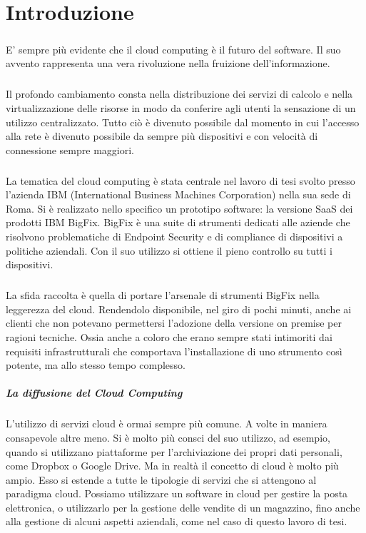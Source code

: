 \chapter{Introduzione}

\paragraph{}
E' sempre più evidente che il cloud computing è il futuro del software. Il suo avvento rappresenta una vera rivoluzione nella fruizione dell'informazione.
\paragraph{}
Il profondo cambiamento consta nella distribuzione dei servizi di calcolo e nella virtualizzazione delle risorse in modo da conferire agli utenti la sensazione di un utilizzo centralizzato. Tutto ciò è divenuto possibile dal momento in cui l'accesso alla rete è divenuto possibile da sempre più dispositivi e con velocità di connessione sempre maggiori.
\paragraph{}
La tematica del cloud computing è stata centrale nel lavoro di tesi svolto presso l'azienda IBM (International Business Machines Corporation) nella sua sede di Roma. Si è realizzato nello specifico un prototipo software: la versione SaaS dei prodotti IBM BigFix. BigFix è una suite di strumenti dedicati alle aziende che risolvono problematiche di Endpoint Security e di compliance di dispositivi a politiche aziendali. Con il suo utilizzo si ottiene il pieno controllo su tutti i dispositivi.
\paragraph{}
La sfida raccolta è quella di portare l'arsenale di strumenti BigFix nella leggerezza del cloud. Rendendolo disponibile, nel giro di pochi minuti, anche ai clienti che non potevano permettersi l'adozione della versione on premise per ragioni tecniche. Ossia anche a coloro che erano sempre stati intimoriti dai requisiti infrastrutturali che comportava l'installazione di uno strumento così potente, ma allo stesso tempo complesso.

\paragraph{La diffusione del Cloud Computing}
L'utilizzo di servizi cloud è ormai sempre più comune. A volte in maniera consapevole altre meno. Si è molto più consci del suo utilizzo, ad esempio, quando si utilizzano piattaforme per l'archiviazione dei propri dati personali, come Dropbox o Google Drive. Ma in realtà il concetto di cloud è molto più ampio. Esso si estende a tutte le tipologie di servizi che si attengono al paradigma cloud. Possiamo utilizzare un software in cloud per gestire la posta elettronica, o utilizzarlo per la gestione delle vendite di un magazzino, fino anche alla gestione di alcuni aspetti aziendali, come nel caso di questo lavoro di tesi.
